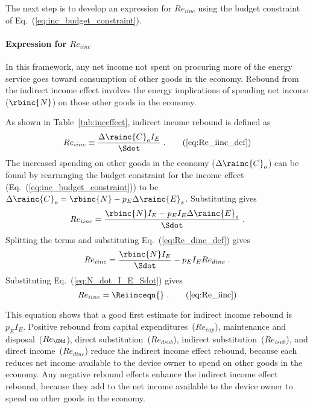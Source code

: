 The next step is to develop an expression for $Re_{iinc}$
using the budget constraint of Eq.~(\ref{eq:inc_budget_constraint}).

\paragraph{Expression for $Re_{iinc}$}
\label{sec:Re_iinc}

In this framework,
any net income not spent on procuring more of the energy service
goes toward consumption of other goods in the economy.
Rebound from the indirect income effect involves 
the energy implications of spending net income ($\rbinc{N}$)
on those other goods in the economy.

As shown in Table~\ref{tab:inceffect}, indirect income rebound is defined as
%
\begin{equation}
  Re_{iinc} \equiv \frac{\Delta \rainc{C}_o I_E}{\Sdot} \; . \tag{\ref{eq:Re_iinc_def}}
\end{equation}
%
The increased spending on other goods in the economy ($\Delta \rainc{C}_o$)
can be found by rearranging the budget constraint for the income effect 
(Eq.~(\ref{eq:inc_budget_constraint})) to be 
$\Delta \rainc{C}_o = \rbinc{N} - p_E \Delta \rainc{E}_s$.
Substituting gives
%
\begin{equation}
  Re_{iinc} = \frac{\rbinc{N} I_E - p_E I_E \Delta \rainc{E}_s}{\Sdot} \; .
\end{equation}
%
Splitting the terms and substituting Eq.~(\ref{eq:Re_dinc_def}) gives
%
\begin{equation}
  Re_{iinc} = \frac{\rbinc{N} I_E}{\Sdot} - p_E I_E Re_{dinc} \; .
\end{equation}
%
Substituting Eq.~(\ref{eq:N_dot_I_E_Sdot}) gives 
%
\begin{equation}
  Re_{iinc} = \Reiinceqn{} \; . \tag{\ref{eq:Re_iinc}}
\end{equation}

This equation shows that a good first estimate for indirect income rebound
is $p_E I_E$.
Positive rebound from capital expenditures~($Re_{cap}$), 
maintenance and disposal~($Re_{\OMd}$),
direct substitution~($Re_{dsub}$), 
indirect substitution~($Re_{isub}$), and 
direct income~($Re_{dinc}$)
reduce the indirect income effect rebound, 
because each reduces net income available to the device owner to spend on other goods in the economy.
Any negative rebound effects enhance the indirect income effect rebound, because 
they add to the net income available to the device owner to spend on other goods in the economy.


